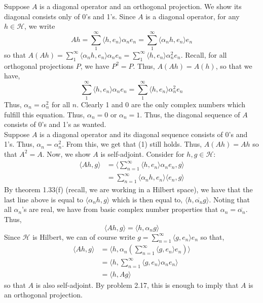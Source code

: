 \documentclass{article}
\begin{document}
    \begin{Answer}
        Suppose $A$ is a diagonal operator and an orthogonal projection. We show its diagonal consists only of 0's and 1's. Since $A$ is
        a diagonal operator, for any $h\in\mathscr{H}$, we write 
        \[ Ah = \sum_1^{\infty} \langle h,e_n\rangle \alpha_n e_n = \sum_1^{\infty} \langle \alpha_n h, e_n\rangle e_n \]
        so that $A(Ah) = \sum_1^{\infty} \langle \alpha_n h,e_n\rangle \alpha_n e_n = \sum_1^{\infty} \langle h,e_n\rangle \alpha_n^2 e_n$.
        Recall, for all orthogonal projections $P$, we have $P^2 = P$. Thus, $A(Ah) = A(h)$, so that we have,
        \begin{equation}
            \sum_1^{\infty} \langle h,e_n\rangle \alpha_n e_n = \sum_1^{\infty} \langle h,e_n\rangle \alpha_n^2 e_n
        \end{equation}
        Thus, $\alpha_n = \alpha_n^2$ for all $n$. Clearly 1 and 0 are the only complex numbers which fulfill this equation. Thus,
        $\alpha_n = 0$ or $\alpha_n = 1$. Thus, the diagonal sequence of $A$ consists of 0's and 1's as wanted.\\

        Suppose $A$ is a diagonal operator and its diagonal sequence consists of 0's and 1's. Thus, $\alpha_n = \alpha_n^2$. From this,
        we get that (1) still holds. Thus, $A(Ah) = Ah$ so that $A^2 = A$. Now, we show $A$ is self-adjoint. Consider for $h,g\in\mathscr{H}$:
        \begin{align*}
            \langle Ah,g\rangle &= \langle \sum_{n=1}^{\infty} \langle h,e_n\rangle \alpha_n e_n,g\rangle  \\
                &= \sum_{n=1}^{\infty} \langle \alpha_n h,e_n\rangle \langle e_n,g\rangle 
        \end{align*}
        By theorem 1.33(f) (recall, we are working in a Hilbert space), 
        we have that the last line above is equal to $\langle \alpha_n h, g\rangle$ which is then
        equal to, $\langle h, \overline{\alpha_n} g\rangle$. Noting that all $\alpha_n$'s are real, we have
        from basic complex number properties that $\alpha_n = \overline{\alpha_n}$. Thus,
        \[ \langle Ah,g\rangle = \langle h,\alpha_n g\rangle\]
        Since $\mathscr{H}$ is Hilbert, we can of course write $g = \sum_{n=1}^{\infty} \langle g,e_n\rangle e_n$ so that,
        \begin{align*}
            \langle Ah, g\rangle &= \langle h,\alpha_n (\sum_{n=1}^{\infty} \langle g,e_n\rangle e_n)\rangle \\
                &= \langle h, \sum_{n=1}^{\infty} \langle g,e_n\rangle \alpha_n e_n\rangle \\
                &= \langle h, Ag\rangle
        \end{align*}
        so that $A$ is also self-adjoint. By problem 2.17, this is enough to imply that $A$ is an orthogonal projection.
    \end{Answer}
\end{document}
